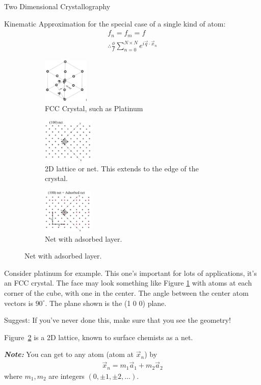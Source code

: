 \documentclass{article}
\newcommand{\note}[1]{\vspace{3\parsep}\textit{\textbf{Note: }}#1\vspace{2\parsep}}
\begin{document}
\begin{section}{Two Dimensional Crystallography}
\begin{subsection}{Kinematic Approximation}
for the special case of a single kind of atom:
\begin{align*}
	f_n = f_m = f\\
	\therefore \frac{\phi}{f}\sum_{n=0}^{N\times N}e^{i\vec{q}\cdot\vec{x}_n}
\end{align*}
\begin{figure}[h]
	\centering
	\begin{subfigure}[t]{0.30\textwidth}
		\centering
		\includegraphics[height=60pt]{FCC100_2}
		\caption{FCC Crystal, such as Platinum}
		\label{fig:FCC}
	\end{subfigure}
	\begin{subfigure}[t]{0.30\textwidth}
		\centering
		\includegraphics[height=60pt]{100plane2}
		\caption{2D lattice or net. This extends to the edge of the crystal.}
		\label{fig:Net}
	\end{subfigure}
	\begin{subfigure}[t]{0.33\textwidth}
		\centering
		\includegraphics[height=60pt]{100plane2_ads}
		\caption{Net with adsorbed layer.}
		\label{fig:NetAds}
	\end{subfigure}
\end{figure}
Consider platinum for example. This one's important for lots of applications, it's an FCC crystal. The face may look something like Figure \ref{fig:FCC}
with atoms at each corner of the cube, with one in the center.  The angle between the center atom vectors is $90^\circ$. The plane shown is the (1 0 0) plane.

Suggest: If you've never done this, make sure that you see the geometry!

Figure~\ref{fig:Net} 
is a 2D lattice, known to surface chemists as a net. 

\note{You can get to any atom (atom at $\vec{x}_n$) by 
\begin{align*}
	\vec{x}_n = m_1 \vec{a}_1 + m_2\vec{a}_2
\end{align*}
where $m_1,m_2$ are integers $(0,\pm1,\pm2,\dots)$.}


\end{subsection}
\end{section}
\end{document}
